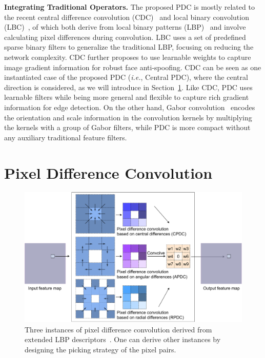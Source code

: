 \documentclass[10pt,twocolumn,letterpaper]{article}
\begin{document}
\vspace{0.3em}
\noindent \textbf{Integrating Traditional Operators.}  \quad The proposed PDC is mostly related to the recent central difference convolution (CDC)~\cite{yu2020cdc,yu2020fas,yu2021dual,yu2021searching} and local binary convolution (LBC)~\cite{juefei2017lbc}, of which both derive from local binary patterns (LBP)~\cite{ojala2002lbp} and involve calculating pixel differences during convolution. LBC uses a set of predefined sparse binary filters to generalize the traditional LBP, focusing on reducing the network complexity. CDC further proposes to use learnable weights to capture image gradient information for robust face anti-spoofing. CDC can be seen as one instantiated case of the proposed PDC (\emph{i.e.}, Central PDC), where the central direction is considered, as we will introduce in Section~\ref{sec:pdc}. Like CDC, PDC uses learnable filters while being more general and flexible to capture rich gradient information for edge detection. On the other hand, Gabor convolution~\cite{luan2018gabor} encodes the orientation and scale information in the convolution kernels by multiplying the kernels with a group of Gabor filters, while PDC is more compact without any auxiliary traditional feature filters.


\section{Pixel Difference Convolution}
\label{sec:pdc}

\begin{figure}[t!]
    \centering
    \includegraphics[width=1\linewidth]{images/pdc.pdf}
    \caption{Three instances of pixel difference convolution derived from extended LBP descriptors~\cite{liu2011sorted, liu2012extended, su2019bird}. One can derive other instances by designing the picking strategy of the pixel pairs.}
    \label{fig:pdc}
\end{figure}
\end{document}
